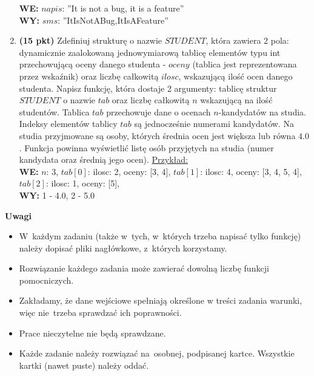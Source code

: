 \documentclass[extrafontsizes,10pt]{article}
\begin{document}
\begin{enumerate}
\textbf{WE:} $napis$: ''It is not a bug, it is a feature'' \\
\textbf{WY:} $sms$: ''ItIsNotABug,ItIsAFeature'' \\

\item \textbf{(15 pkt)}
Zdefiniuj strukturę o nazwie $STUDENT$, która zawiera 2 pola:
dynamicznie zaalokowaną jednowymiarową tablicę elementów typu
int przechowującą oceny danego studenta - $oceny$
(tablica jest reprezentowana przez wskaźnik)
oraz liczbę całkowitą $ilosc$, wskazującą ilość ocen danego studenta.
Napisz funkcję, która dostaje 2 argumenty:
tablicę struktur $STUDENT$ o nazwie $tab$
oraz liczbę całkowitą $n$ wskazującą na ilość studentów.
Tablica $tab$ przechowuje dane o ocenach $n$-kandydatów na studia.
Indeksy elementów tablicy $tab$ są jednocześnie numerami kandydatów.
Na studia przyjmowane są osoby, których średnia ocen jest
większa lub równa $4.0$.
Funkcja powinna wyświetlić listę osób przyjętych na studia
(numer kandydata oraz średnią jego ocen).
\underline{Przykład:} \\

\textbf{WE:} $n$: 3, $tab[0]$: { {ilosc: 2, oceny: [3, 4]}, $tab[1]$: {ilosc: 4, oceny: [3, 4, 5, 4]},  $tab[2]$:
{ilosc: 1, oceny: [5]}},  \\
\textbf{WY:} 1 - 4.0, 2 - 5.0  


\end{enumerate}

\vfill

\textbf{Uwagi}

\begin{itemize}
 \item W~każdym zadaniu (także w~tych, w~których trzeba napisać tylko funkcję) należy dopisać pliki nagłówkowe, z~których korzystamy.
 \item Rozwiązanie każdego zadania może zawierać dowolną liczbę funkcji pomocniczych.
 \item Zakładamy, że dane wejściowe spełniają określone w treści zadania warunki, więc nie~trzeba sprawdzać ich poprawności.
 \item Prace nieczytelne nie będą sprawdzane.
 \item Każde zadanie należy rozwiązać na~osobnej, podpisanej kartce. Wszystkie kartki (nawet puste) należy oddać.
\end{itemize}
\end{document}
